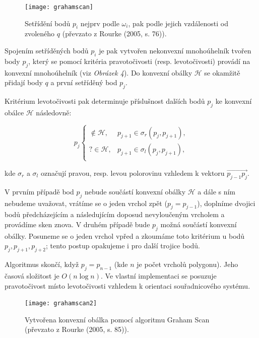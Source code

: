 \begin{figure}[h]
\centering
\texttt{[image: grahamscan]} 
    \caption{Setřídění bodů $p_i$ nejprv podle $\omega_i$, pak podle jejich vzdálenosti od zvoleného $q$ (převzato z Rourke (2005, s. 76)).}
\end{figure}

\par Spojením setříděných bodů $p_i$ je pak vytvořen nekonvexní mnohoúhelník tvořen body $p_j$, který se pomocí kritéria pravotočivosti (resp. levotočivosti) provádí na konvexní mnohoúhelník (viz \emph{Obrázek 4}). Do konvexní obálky $\mathcal{H}$ se okamžitě přidají body $q$ a první setříděný bod $p_j$.

\par Kritérium levotočivosti pak determinuje příslušnost dalších bodů $p_j$ ke konvexní obálce $\mathcal{H}$ následovně:

\begin{equation*} p_j\begin{cases} \notin \mathcal{H}, & \text{$p_{j+1} \in \sigma_r(p_j, p_{j+1})$}, \\ ? \in \mathcal{H}, & \text{$p_{j+1} \in \sigma_l(p_j, p_{j+1})$}, \\\end{cases}\end{equation*}

\par kde $\sigma_r$ a $\sigma_l$ označují pravou, resp. levou polorovinu vzhledem k vektoru $\overrightarrow{p_{j-1}p_j}$.

\par V prvním případě bod $p_j$ nebude součástí konvexní obálky $\mathcal{H}$ a dále s ním nebudeme uvažovat, vrátíme se o jeden vrchol zpět ($p_j = p_{j-1}$), doplníme dvojici bodů předcházejícím a následujícím doposud nevyloučeným vrcholem a provádíme sken znova. V druhém případě bude $p_j$ možná součástí konvexní obálky. Posuneme se o jeden vrchol vpřed a zkoumáme toto kritérium u bodů $p_j, p_{j+1}, p_{j+2}$; tento postup opakujeme i pro další trojice bodů.

\par Algoritmus skončí, když $p_j = p_{n-1}$ (kde $n$ je počet vrcholů polygonu). Jeho časová složitost je $O(n\log{n})$. Ve vlastní implementaci se posuzuje pravotočivost místo levotočivosti vzhledem k orientaci souřadnicového systému.

\begin{figure}[h]
\centering
\texttt{[image: grahamscan2]} 
    \caption{Vytvořena konvexní obálka pomocí algoritmu Graham Scan (převzato z Rourke (2005, s. 85)).}
\end{figure}

